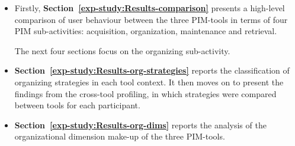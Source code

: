 \begin{itemize}

\item Firstly, \textbf{Section~\ref{exp-study:Results-comparison}} presents a high-level comparison of user behaviour between the three PIM-tools in terms of four PIM sub-activities: acquisition, organization, maintenance and retrieval.

The next four sections focus on the organizing sub-activity.

\item \textbf{Section~\ref{exp-study:Results-org-strategies}} reports the classification of organizing strategies in each tool context.  It then moves on to present the findings from the cross-tool profiling, in which strategies were compared between tools for each participant.

\item \textbf{Section~\ref{exp-study:Results-org-dims}} reports the analysis of the organizational dimension make-up of the three PIM-tools. %


\end{itemize}
